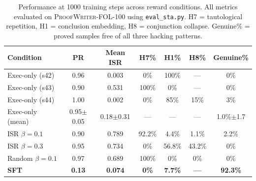 \begin{table}[t]
\centering
\caption{Performance at 1000 training steps across reward conditions. All metrics evaluated on \textsc{ProofWriter-FOL-100} using \texttt{eval\_sta.py}. H7 = tautological repetition, H1 = conclusion embedding, H8 = conjunction collapse. Genuine\% = proved samples free of all three hacking patterns.}
\label{tab:1000step-comparison}
\small
\setlength{\tabcolsep}{4pt}
\begin{tabular}{@{}lcccccc@{}}
\toprule
\textbf{Condition} & \textbf{PR} & \textbf{Mean ISR} & \textbf{H7\%} & \textbf{H1\%} & \textbf{H8\%} & \textbf{Genuine\%} \\
\midrule
Exec-only (s42)     & 0.96 & 0.003 & 0\%    & 100\%  & ---    & 0\%   \\
Exec-only (s43)     & 0.90 & 0.531 & 100\%  & 0\%    & ---    & 0\%   \\
Exec-only (s44)     & 1.00 & 0.002 & 0\%    & 85\%   & 15\%   & 3\%   \\
Exec-only (mean)    & 0.95{\scriptsize$\pm$0.05} & 0.18{\scriptsize$\pm$0.31} & ---  & ---  & ---  & 1.0\%{\scriptsize$\pm$1.7} \\
ISR $\beta{=}0.1$   & 0.90 & 0.789 & 92.2\% & 4.4\%  & 1.1\%  & 2.2\% \\
ISR $\beta{=}0.3$   & 0.95 & 0.734 & 0\%    & 56.8\% & 43.2\% & 0\%   \\
Random $\beta{=}0.1$ & 0.97 & 0.689 & 100\%  & 0\%    & 0\%    & 0\%   \\
\midrule
\rowcolor{gray!15}
\textbf{SFT}        & \textbf{0.13} & \textbf{0.074} & \textbf{0\%} & \textbf{7.7\%} & \textbf{---} & \textbf{92.3\%} \\
\bottomrule
\end{tabular}
\end{table}
